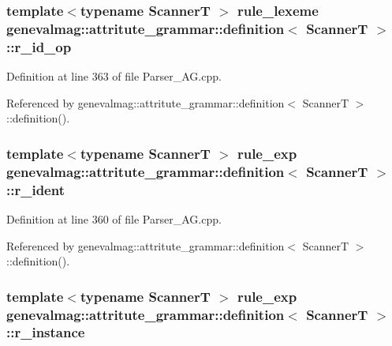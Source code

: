 \hypertarget{structgenevalmag_1_1attritute__grammar_1_1definition_a36ec94f7566710ed880ee89dfa1d3c57}{
\subsubsection[{r\_\-id\_\-op}]{\setlength{\rightskip}{0pt plus 5cm}template$<$typename ScannerT $>$ {\bf rule\_\-lexeme} {\bf genevalmag::attritute\_\-grammar::definition}$<$ ScannerT $>$::{\bf r\_\-id\_\-op}}}
\label{structgenevalmag_1_1attritute__grammar_1_1definition_a36ec94f7566710ed880ee89dfa1d3c57}


Definition at line 363 of file Parser\_\-AG.cpp.



Referenced by genevalmag::attritute\_\-grammar::definition$<$ ScannerT $>$::definition().

\hypertarget{structgenevalmag_1_1attritute__grammar_1_1definition_a3cd3a5ea5bb94000d6283f353f49017b}{
\subsubsection[{r\_\-ident}]{\setlength{\rightskip}{0pt plus 5cm}template$<$typename ScannerT $>$ {\bf rule\_\-exp} {\bf genevalmag::attritute\_\-grammar::definition}$<$ ScannerT $>$::{\bf r\_\-ident}}}
\label{structgenevalmag_1_1attritute__grammar_1_1definition_a3cd3a5ea5bb94000d6283f353f49017b}


Definition at line 360 of file Parser\_\-AG.cpp.



Referenced by genevalmag::attritute\_\-grammar::definition$<$ ScannerT $>$::definition().

\hypertarget{structgenevalmag_1_1attritute__grammar_1_1definition_a47295777cd7f9a9069b7dc3aa42a9e6a}{
\subsubsection[{r\_\-instance}]{\setlength{\rightskip}{0pt plus 5cm}template$<$typename ScannerT $>$ {\bf rule\_\-exp} {\bf genevalmag::attritute\_\-grammar::definition}$<$ ScannerT $>$::{\bf r\_\-instance}}}
\label{structgenevalmag_1_1attritute__grammar_1_1definition_a47295777cd7f9a9069b7dc3aa42a9e6a}


